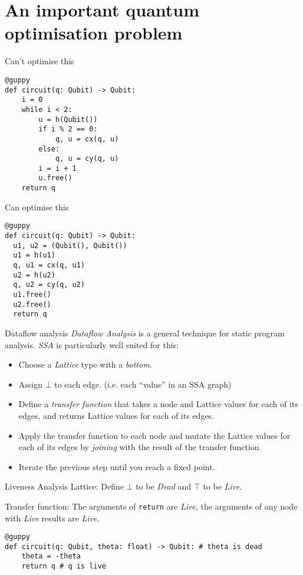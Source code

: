 \documentclass[presentation]{beamer}
\begin{document}
\section{An important quantum optimisation problem}
\label{sec:org6f1f634}
\begin{frame}[label={sec:orgd92d9c2},fragile]{Can't optimise this}
 \begin{verbatim}
@guppy
def circuit(q: Qubit) -> Qubit:
    i = 0
    while i < 2:
        u = h(Qubit())
        if i % 2 == 0:
            q, u = cx(q, u)
        else:
            q, u = cy(q, u)
        i = i + 1
        u.free()
    return q
\end{verbatim}
\end{frame}
\begin{frame}[label={sec:orgf1543fa},fragile]{Can optimise this}
 \begin{verbatim}
@guppy
def circuit(q: Qubit) -> Qubit:
  u1, u2 = (Qubit(), Qubit())
  u1 = h(u1)
  q, u1 = cx(q, u1)
  u2 = h(u2)
  q, u2 = cy(q, u2)
  u1.free()
  u2.free()
  return q
\end{verbatim}
\end{frame}
\begin{frame}[label={sec:orgacf7205}]{Dataflow analysis}
\emph{Dataflow Analysis} is a general technique for static program analysis. \emph{SSA} is particularly well suited for this:
\begin{itemize}
\item Choose a \emph{Lattice} type with a \emph{bottom}.
\item Assign \(\bot\) to each edge. (i.e. each ``value'' in an SSA graph)
\item Define a \emph{transfer function} that takes a node and Lattice values for each of its edges, and returns Lattice values for each of its edges.
\item Apply the transfer function to each node and mutate the Lattice values for each of its edges by \emph{joining} with the result of the transfer function.
\item Iterate the previous step until you reach a fixed point.
\end{itemize}
\end{frame}
\begin{frame}[label={sec:org8bffd0c},fragile]{Liveness Analysis}
 Lattice: Define \(\bot\) to be \emph{Dead} and \(\top\) to be \emph{Live}.

Transfer function: The arguments of \texttt{return} are \emph{Live}, the arguments of any node with \emph{Live} results are \emph{Live}.

\begin{verbatim}
@guppy
def circuit(q: Qubit, theta: float) -> Qubit: # theta is dead
    theta = -theta
    return q # q is live
\end{verbatim}
\end{frame}
\end{document}
